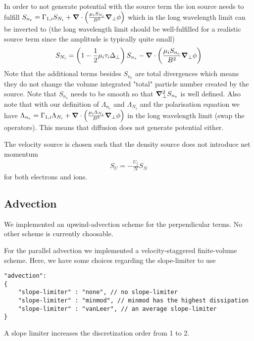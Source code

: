In order to not generate potential with the source term the
ion source needs to fulfill $S_{n_e} = \Gamma_{1,i}S_{N_i} + {\boldsymbol{\nabla}}\cdot\left( \frac{\mu_i S_{N_i}}{B^2}{\boldsymbol{\nabla}}_{\perp} \phi\right)$ which in the long wavelength limit can be inverted to (the long wavelength limit should be well-fulfilled for a realistic source term since the amplitude is typically quite small)
\begin{align}
    S_{N_i} = \left(1-\frac{1}{2}\mu_i \tau_i \Delta_\perp\right) S_{n_e} -{\boldsymbol{\nabla}}\cdot\left( \frac{\mu_i S_{n_e}}{B^2}{\boldsymbol{\nabla}}_{\perp} \phi\right)
  \label{eq:ion_source}
\end{align}
Note that the additional terms besides $S_{n_e}$ are total divergences which means
they do not change the volume integrated "total" particle number created by the source.
Note that $S_{n_e}$ needs to be smooth
so that ${\boldsymbol{\nabla}}_{\perp}^2 S_{n_e}$ is well defined.
Also note that with our definition of $\Lambda_{n_e}$ and $\Lambda_{N_i}$ and
the polarisation equation we have $\Lambda_{n_e} = \Gamma_{1,i}\Lambda_{N_i} + {\boldsymbol{\nabla}}\cdot\left( \frac{\mu_i \Lambda_{N_i}}{B^2}{\boldsymbol{\nabla}}_{\perp} \phi\right)$ in the long wavelength limit (swap the operators).
This means that diffusion does not generate potential either.

The velocity source is chosen such that the density source does not introduce
net momentum
\begin{align}
    S_U = -\frac{U_\parallel}{N} S_N
\end{align}
for both electrons and ions.

\subsection{Advection}
We implemented an upwind-advection scheme for the perpendicular terms.
No other scheme is currently choosable.

For the parallel advection we implemented a velocity-staggered finite-volume
scheme. Here, we have some choices regarding the slope-limiter to use
\begin{verbatim}
"advection":
{
    "slope-limiter" : "none", // no slope-limiter
    "slope-limiter" : "minmod", // minmod has the highest dissipation
    "slope-limiter" : "vanLeer", // an average slope-limiter
}
\end{verbatim}
\begin{tcolorbox}[title=Note]
    A slope limiter increases the discretization order from 1 to 2.
\end{tcolorbox}
